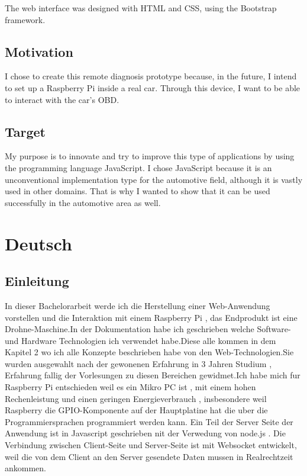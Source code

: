 The web interface was designed with HTML and CSS, using the Bootstrap framework. 

\subsection{Motivation}

I chose to create this remote diagnosis prototype because, in the future, I intend to set up a Raspberry Pi inside a real car. Through this device, I want to be able to interact with the car’s OBD.

\subsection{Target}
My purpose is to innovate and try to improve this type of applications by using the programming language JavaScript. I chose JavaScript because it is an unconventional implementation type for the automotive field, although it is vastly used in other domains. That is why I wanted to show that it can be used successfully in the automotive area as well. 
\section{Deutsch}

\subsection{Einleitung}
In dieser Bachelorarbeit werde ich die Herstellung einer Web-Anwendung vorstellen und die Interaktion mit einem Raspberry Pi , das Endprodukt ist eine Drohne-Maschine.In der Dokumentation habe ich geschrieben welche Software- und Hardware Technologien ich verwendet habe.Diese alle kommen in dem Kapitel 2 wo ich alle Konzepte beschrieben habe von den Web-Technologien.Sie wurden ausgewahlt nach der gewonenen Erfahrung in 3 Jahren Studium , Erfahrung fallig der Vorlesungen zu diesen Bereichen gewidmet.Ich habe mich fur Raspberry Pi entschieden weil es ein Mikro PC ist , mit einem hohen Rechenleistung und einen geringen Energieverbrauch , insbesondere weil Raspberry die GPIO-Komponente auf der Hauptplatine hat die uber die Programmiersprachen programmiert werden kann. Ein Teil der Server Seite der Anwendung ist in Javascript geschrieben nit der Verwedung von node.js . Die Verbindung zwischen Client-Seite und Server-Seite ist mit Websocket  entwickelt, weil die von dem Client an den Server gesendete Daten mussen in Realrechtzeit ankommen.

